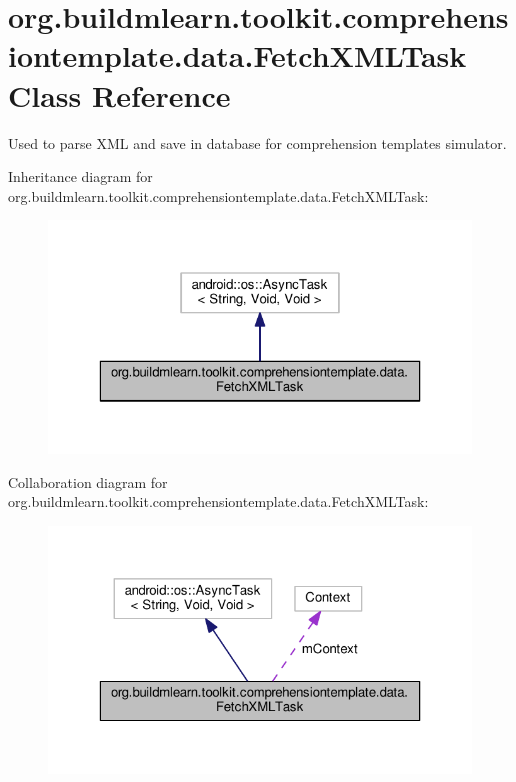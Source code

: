\hypertarget{classorg_1_1buildmlearn_1_1toolkit_1_1comprehensiontemplate_1_1data_1_1FetchXMLTask}{}\section{org.\+buildmlearn.\+toolkit.\+comprehensiontemplate.\+data.\+Fetch\+X\+M\+L\+Task Class Reference}
\label{classorg_1_1buildmlearn_1_1toolkit_1_1comprehensiontemplate_1_1data_1_1FetchXMLTask}


Used to parse X\+ML and save in database for comprehension template\textquotesingle{}s simulator.  




Inheritance diagram for org.\+buildmlearn.\+toolkit.\+comprehensiontemplate.\+data.\+Fetch\+X\+M\+L\+Task\+:
\nopagebreak
\begin{figure}[H]
\begin{center}
\leavevmode
\includegraphics[width=323pt]{classorg_1_1buildmlearn_1_1toolkit_1_1comprehensiontemplate_1_1data_1_1FetchXMLTask__inherit__graph}
\end{center}
\end{figure}


Collaboration diagram for org.\+buildmlearn.\+toolkit.\+comprehensiontemplate.\+data.\+Fetch\+X\+M\+L\+Task\+:
\nopagebreak
\begin{figure}[H]
\begin{center}
\leavevmode
\includegraphics[width=323pt]{classorg_1_1buildmlearn_1_1toolkit_1_1comprehensiontemplate_1_1data_1_1FetchXMLTask__coll__graph}
\end{center}
\end{figure}
